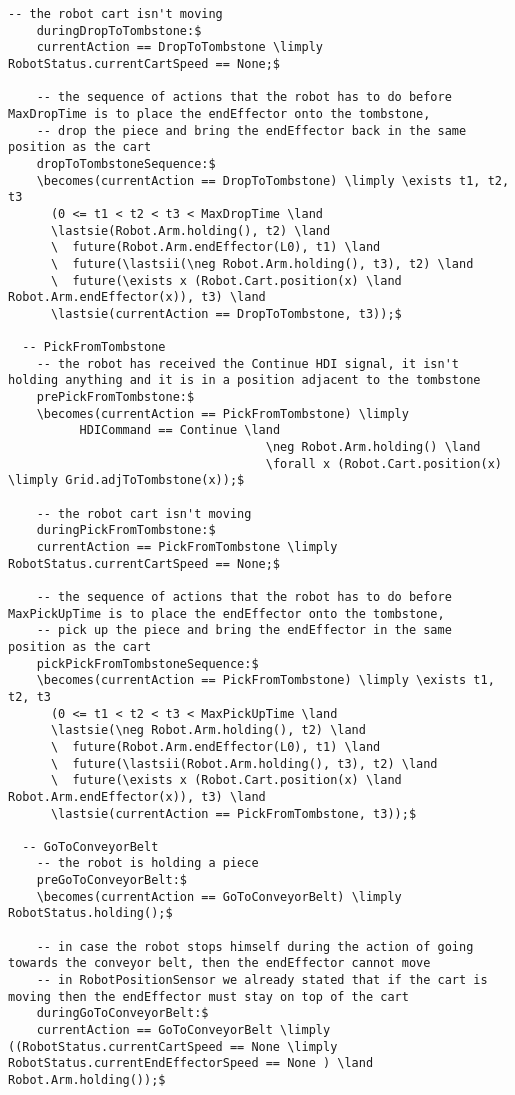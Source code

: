 \begin{lstlisting}[fontadjust, mathescape, frame=tlb]
    -- the robot cart isn't moving
    duringDropToTombstone:$
    currentAction == DropToTombstone \limply RobotStatus.currentCartSpeed == None;$

    -- the sequence of actions that the robot has to do before MaxDropTime is to place the endEffector onto the tombstone,
    -- drop the piece and bring the endEffector back in the same position as the cart
    dropToTombstoneSequence:$
    \becomes(currentAction == DropToTombstone) \limply \exists t1, t2, t3
      (0 <= t1 < t2 < t3 < MaxDropTime \land
      \lastsie(Robot.Arm.holding(), t2) \land
      \  future(Robot.Arm.endEffector(L0), t1) \land
      \  future(\lastsii(\neg Robot.Arm.holding(), t3), t2) \land
      \  future(\exists x (Robot.Cart.position(x) \land Robot.Arm.endEffector(x)), t3) \land
      \lastsie(currentAction == DropToTombstone, t3));$

  -- PickFromTombstone
    -- the robot has received the Continue HDI signal, it isn't holding anything and it is in a position adjacent to the tombstone
    prePickFromTombstone:$
    \becomes(currentAction == PickFromTombstone) \limply
          HDICommand == Continue \land
                                    \neg Robot.Arm.holding() \land
                                    \forall x (Robot.Cart.position(x) \limply Grid.adjToTombstone(x));$

    -- the robot cart isn't moving
    duringPickFromTombstone:$
    currentAction == PickFromTombstone \limply RobotStatus.currentCartSpeed == None;$

    -- the sequence of actions that the robot has to do before MaxPickUpTime is to place the endEffector onto the tombstone,
    -- pick up the piece and bring the endEffector in the same position as the cart
    pickPickFromTombstoneSequence:$
    \becomes(currentAction == PickFromTombstone) \limply \exists t1, t2, t3
      (0 <= t1 < t2 < t3 < MaxPickUpTime \land
      \lastsie(\neg Robot.Arm.holding(), t2) \land
      \  future(Robot.Arm.endEffector(L0), t1) \land
      \  future(\lastsii(Robot.Arm.holding(), t3), t2) \land
      \  future(\exists x (Robot.Cart.position(x) \land Robot.Arm.endEffector(x)), t3) \land
      \lastsie(currentAction == PickFromTombstone, t3));$
    
  -- GoToConveyorBelt
    -- the robot is holding a piece
    preGoToConveyorBelt:$
    \becomes(currentAction == GoToConveyorBelt) \limply RobotStatus.holding();$
    
    -- in case the robot stops himself during the action of going towards the conveyor belt, then the endEffector cannot move
    -- in RobotPositionSensor we already stated that if the cart is moving then the endEffector must stay on top of the cart
    duringGoToConveyorBelt:$
    currentAction == GoToConveyorBelt \limply ((RobotStatus.currentCartSpeed == None \limply RobotStatus.currentEndEffectorSpeed == None ) \land Robot.Arm.holding());$


\end{lstlisting}
